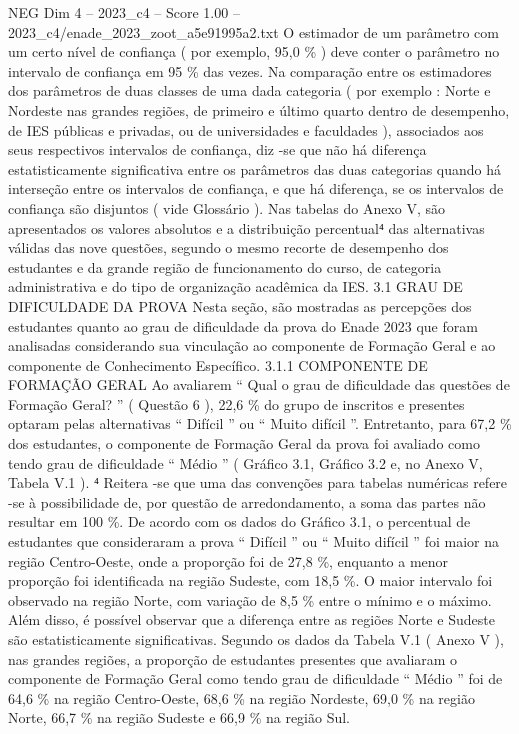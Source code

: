 \begin{textsample}{NEG Dim 4 – 2023\_c4 – Score 1.00 – 2023\_c4/enade\_2023\_zoot\_a5e91995a2.txt}
O estimador de um parâmetro com um certo nível de confiança ( por exemplo, 95,0 \% ) deve conter o parâmetro no intervalo de confiança em 95 \% das vezes.
Na comparação entre os estimadores dos parâmetros de duas classes de uma dada categoria ( por exemplo : Norte e Nordeste nas grandes regiões, de primeiro e último quarto dentro de desempenho, de IES públicas e privadas, ou de universidades e faculdades ), associados aos seus respectivos intervalos de confiança, diz -se que não há diferença estatisticamente significativa entre os parâmetros das duas categorias quando há interseção entre os intervalos de confiança, e que há diferença, se os intervalos de confiança são disjuntos ( vide Glossário ).
Nas tabelas do Anexo V, são apresentados os valores absolutos e a distribuição percentual⁴ das alternativas válidas das nove questões, segundo o mesmo recorte de desempenho dos estudantes e da grande região de funcionamento do curso, de categoria administrativa e do tipo de organização acadêmica da IES. 3.1 GRAU DE DIFICULDADE DA PROVA Nesta seção, são mostradas as percepções dos estudantes quanto ao grau de dificuldade da prova do Enade 2023 que foram analisadas considerando sua vinculação ao componente de Formação Geral e ao componente de Conhecimento Específico. 3.1.1 COMPONENTE DE FORMAÇÃO GERAL Ao avaliarem “ Qual o grau de dificuldade das questões de Formação Geral? ” ( Questão 6 ), 22,6 \% do grupo de inscritos e presentes optaram pelas alternativas “ Difícil ” ou “ Muito difícil ”.
Entretanto, para 67,2 \% dos estudantes, o componente de Formação Geral da prova foi avaliado como tendo grau de dificuldade “ Médio ” ( Gráfico 3.1, Gráfico 3.2 e, no Anexo V, Tabela V.1 ). ⁴ Reitera -se que uma das convenções para tabelas numéricas refere -se à possibilidade de, por questão de arredondamento, a soma das partes não resultar em 100 \%.
De acordo com os dados do Gráfico 3.1, o percentual de estudantes que consideraram a prova “ Difícil ” ou “ Muito difícil ” foi maior na região Centro-Oeste, onde a proporção foi de 27,8 \%, enquanto a menor proporção foi identificada na região Sudeste, com 18,5 \%.
O maior intervalo foi observado na região Norte, com variação de 8,5 \% entre o mínimo e o máximo.
Além disso, é possível observar que a diferença entre as regiões Norte e Sudeste são estatisticamente significativas.
Segundo os dados da Tabela V.1 ( Anexo V ), nas grandes regiões, a proporção de estudantes presentes que avaliaram o componente de Formação Geral como tendo grau de dificuldade “ Médio ” foi de 64,6 \% na região Centro-Oeste, 68,6 \% na região Nordeste, 69,0 \% na região Norte, 66,7 \% na região Sudeste e 66,9 \% na região Sul.

\end{textsample}
